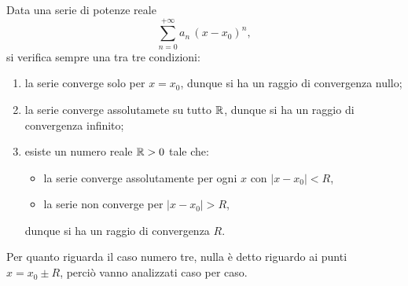 \documentclass[../../analisi2]{subfiles}
\begin{document}
        \begin{teorema}
            Data una serie di potenze reale
            \[
                \sum_{n = 0}^{+\infty} a_n \, (x - x_0)^n,
            \]
            si verifica sempre una tra tre condizioni:
            \begin{enumerate}
                \item la serie converge solo per \(x = x_0\), dunque si ha un raggio di convergenza nullo;
                \item la serie converge assolutamete su tutto \(\mathbb{R}\), dunque si ha un raggio di convergenza infinito;
                \item esiste un numero reale \(\mathbb{R} > 0\) tale che:
                    \begin{itemize}
                        \item la serie converge assolutamente per ogni \(x\) con \(|x - x_0|  < R\),
                        \item la serie non converge per \(|x - x_0| > R\),
                    \end{itemize}
                    dunque si ha un raggio di convergenza \(R\).
            \end{enumerate}
        \end{teorema}
        \begin{osservazione}
            Per quanto riguarda il caso numero tre, nulla è detto riguardo ai punti \(x = x_0 \pm R\), perciò vanno analizzati caso
            per caso.
        \end{osservazione}
\end{document}
